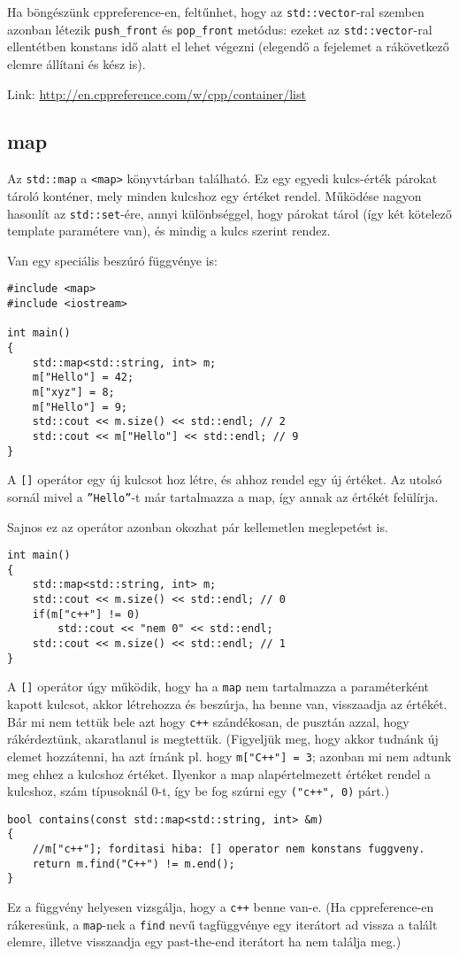 \documentclass[a4paper,11.5pt,table]{article}
\begin{document}
	\medskip
	Ha böngészünk cppreference-en, feltűnhet, hogy az \texttt{std::vector}-ral szemben azonban létezik \texttt{push\_front} és \texttt{pop\_front} metódus: ezeket az \texttt{std::vector}-ral ellentétben konstans idő alatt el lehet végezni (elegendő a fejelemet a rákövetkező elemre állítani és kész is).
	\medskip
	
	Link: \url{http://en.cppreference.com/w/cpp/container/list}
	\subsection{map}
	Az \texttt{std::map} a \texttt{<map>} könyvtárban található. Ez egy egyedi kulcs-érték párokat tároló konténer, mely minden kulcshoz egy értéket rendel. Működése nagyon hasonlít az \texttt{std::set}-ére, annyi különbséggel, hogy párokat tárol (így két kötelező template paramétere van), és mindig a kulcs szerint rendez.
	\smallskip
	
	Van egy speciális beszúró függvénye is:
\begin{lstlisting}
#include <map>
#include <iostream>

int main()
{
	std::map<std::string, int> m;
	m["Hello"] = 42;
	m["xyz"] = 8;
	m["Hello"] = 9;
	std::cout << m.size() << std::endl; // 2
	std::cout << m["Hello"] << std::endl; // 9
}
\end{lstlisting}
	A \texttt{[]} operátor egy új kulcsot hoz létre, és ahhoz rendel egy új értéket. Az utolsó sornál mivel a \texttt{''Hello''}-t már tartalmazza a map, így annak az értékét felülírja.
	
	\medskip
	Sajnos ez az operátor azonban okozhat pár kellemetlen meglepetést is.
	\begin{lstlisting}
int main()
{
	std::map<std::string, int> m;
	std::cout << m.size() << std::endl; // 0
	if(m["c++"] != 0)
		std::cout << "nem 0" << std::endl;
	std::cout << m.size() << std::endl; // 1
}
	\end{lstlisting}
	A \texttt{[]} operátor úgy működik, hogy ha a \texttt{map} nem tartalmazza a paraméterként kapott kulcsot, akkor létrehozza és beszúrja, ha benne van, visszaadja az értékét. Bár mi nem tettük bele azt hogy \texttt{c++} szándékosan, de pusztán azzal, hogy rákérdeztünk, akaratlanul is megtettük. (Figyeljük meg, hogy akkor tudnánk új elemet hozzátenni, ha azt írnánk pl. hogy \texttt{m["C++"] = 3}; azonban mi nem adtunk meg ehhez a kulcshoz értéket. Ilyenkor a map alapértelmezett értéket rendel a kulcshoz, szám típusoknál 0-t, így be fog szúrni egy \texttt{("c++", 0)} párt.)
	\begin{lstlisting}
bool contains(const std::map<std::string, int> &m)
{
	//m["c++"]; forditasi hiba: [] operator nem konstans fuggveny.
	return m.find("C++") != m.end();
}
	\end{lstlisting}
	Ez a függvény helyesen vizsgálja, hogy a \texttt{c++} benne van-e. (Ha cppreference-en rákeresünk, a \texttt{map}-nek a \texttt{find} nevű tagfüggvénye egy iterátort ad vissza a talált elemre, illetve visszaadja egy past-the-end iterátort ha nem találja meg.)
	\medskip
	
\end{document}
